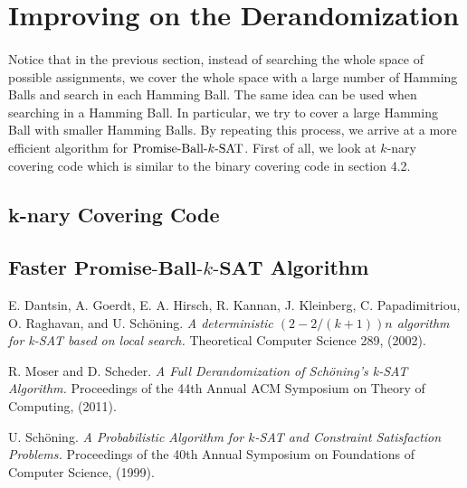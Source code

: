\documentclass[a4paper,12pts]{article}
\newcommand{\SAT}{\textnormal{$k$-SAT}}
\newcommand{\SATbf}{\textbf{$k$-SAT}}
\newcommand{\PBS}{\textnormal{Promise-Ball-$\SAT$}}
\newcommand{\PBSbf}{\textbf{Promise-Ball-$\SATbf$}}
\begin{document}
\section{Improving on the Derandomization\cite{Moser11}}
\paragraph{} Notice that in the previous section, instead of searching the whole space of possible assignments, we cover the whole space with a large number of Hamming Balls and search in each Hamming Ball. The same idea can be used when searching in a Hamming Ball. In particular, we try to cover a large Hamming Ball with smaller Hamming Balls. By repeating this process, we arrive at a more efficient algorithm for $\PBS$. First of all, we look at $k$-nary covering code which is similar to the binary covering code in section 4.2.
\subsection{k-nary Covering Code}
\subsection{Faster $\PBSbf$ Algorithm}


\begin{thebibliography}{9}
E. Dantsin, A. Goerdt, E. A. Hirsch, R. Kannan, J. Kleinberg, C. Papadimitriou, O. Raghavan, and U. Sch\"{o}ning. 
\textit{A deterministic $(2-2/(k+1))n$ algorithm for k-SAT based on local search.} Theoretical Computer Science 289, (2002).

R. Moser and D. Scheder.
\textit{A Full Derandomization of Sch\"{o}ning’s k-SAT Algorithm.} Proceedings of the 44th Annual ACM Symposium on Theory of Computing, (2011).

U. Sch\"{o}ning.
\textit{A Probabilistic Algorithm for $k$-SAT and Constraint Satisfaction Problems.} Proceedings of the 40th Annual Symposium on Foundations of Computer Science, (1999).

\end{thebibliography}
\end{document}
